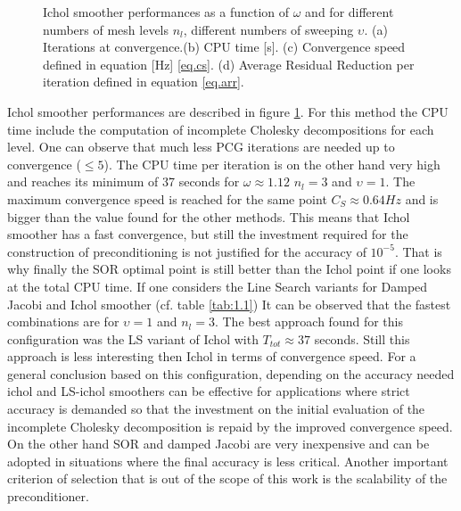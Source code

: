 \begin{figure}[hbt!]
{                                  }
                          \caption{Ichol smoother performances as a function of $\omega$ and for different numbers of mesh levels $n_l$, different numbers of sweeping $\upsilon$. (a) Iterations at convergence.(b) CPU time [s]. (c) Convergence speed defined in equation [Hz] \eqref{eq.cs}. (d) Average Residual Reduction per iteration defined in equation \eqref{eq.arr}. }
                          \label{f.1.34}
                        \end{figure}  
                        Ichol smoother performances are described in figure \ref{f.1.34}.  For this method the CPU time include the computation of incomplete Cholesky decompositions for each level. One can observe that much less PCG iterations are needed up to convergence ($\leq 5$). The CPU time per iteration is on the other hand very high and reaches its minimum of 37 seconds for $\omega\approx1.12$ $n_l=3$ and $\upsilon=1$. The maximum convergence speed is reached for the same point $C_S\approx 0.64 Hz$ and is bigger than the value found for the other methods. This means that Ichol smoother has a fast convergence, but still the investment required for the construction of preconditioning is not justified for the accuracy of $10^{-5}$. That is why finally the SOR optimal point is still better than the Ichol point if one looks at the total CPU time. If one considers the Line Search variants for Damped Jacobi and Ichol smoother (cf. table \ref{tab:1.1}) It can be observed that the fastest combinations are for $\upsilon=1$ and $n_l=3$. The best approach found for this configuration was the LS variant of Ichol with $T_{tot}\approx 37$ seconds. Still this approach is less interesting then Ichol in terms of convergence speed. For a general conclusion based on this configuration, depending on the accuracy needed ichol and LS-ichol smoothers can be effective for applications where strict accuracy is demanded so that the investment on the initial evaluation of the incomplete Cholesky decomposition is repaid by the improved convergence speed. On the other hand SOR and damped Jacobi are very inexpensive and can be adopted in situations where the final accuracy is less critical. Another important criterion of selection that is out of the scope of this work is the scalability of the preconditioner.
